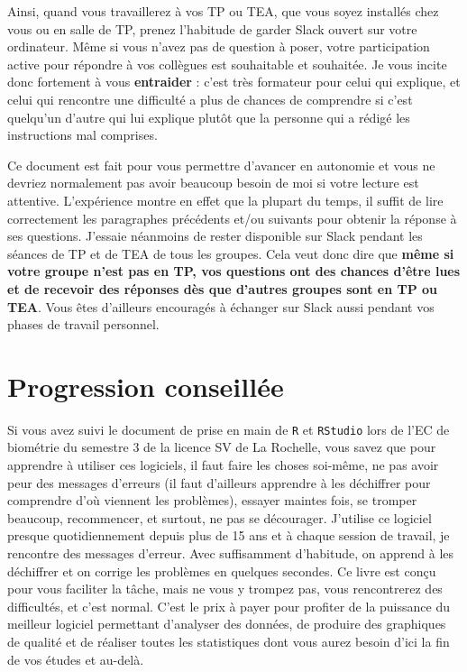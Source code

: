 \documentclass[
  french,
  a4paper,
  DIV=11,
  numbers=noendperiod,
  oneside]{scrreprt}
\begin{document}
Ainsi, quand vous travaillerez à vos TP ou TEA, que vous soyez installés
chez vous ou en salle de TP, prenez l'habitude de garder Slack ouvert
sur votre ordinateur. Même si vous n'avez pas de question à poser, votre
participation active pour répondre à vos collègues est souhaitable et
souhaitée. Je vous incite donc fortement à vous \textbf{entraider} :
c'est très formateur pour celui qui explique, et celui qui rencontre une
difficulté a plus de chances de comprendre si c'est quelqu'un d'autre
qui lui explique plutôt que la personne qui a rédigé les instructions
mal comprises.

Ce document est fait pour vous permettre d'avancer en autonomie et vous
ne devriez normalement pas avoir beaucoup besoin de moi si votre lecture
est attentive. L'expérience montre en effet que la plupart du temps, il
suffit de lire correctement les paragraphes précédents et/ou suivants
pour obtenir la réponse à ses questions. J'essaie néanmoins de rester
disponible sur Slack pendant les séances de TP et de TEA de tous les
groupes. Cela veut donc dire que \textbf{même si votre groupe n'est pas
en TP, vos questions ont des chances d'être lues et de recevoir des
réponses dès que d'autres groupes sont en TP ou TEA}. Vous êtes
d'ailleurs encouragés à échanger sur Slack aussi pendant vos phases de
travail personnel.

\section*{Progression conseillée}\label{progression-conseilluxe9e}


Si vous avez suivi le document de prise en main de \texttt{R} et
\texttt{RStudio} lors de l'EC de biométrie du semestre 3 de la licence
SV de La Rochelle, vous savez que pour apprendre à utiliser ces
logiciels, il faut faire les choses soi-même, ne pas avoir peur des
messages d'erreurs (il faut d'ailleurs apprendre à les déchiffrer pour
comprendre d'où viennent les problèmes), essayer maintes fois, se
tromper beaucoup, recommencer, et surtout, ne pas se décourager.
J'utilise ce logiciel presque quotidiennement depuis plus de 15 ans et à
chaque session de travail, je rencontre des messages d'erreur. Avec
suffisamment d'habitude, on apprend à les déchiffrer et on corrige les
problèmes en quelques secondes. Ce livre est conçu pour vous faciliter
la tâche, mais ne vous y trompez pas, vous rencontrerez des difficultés,
et c'est normal. C'est le prix à payer pour profiter de la puissance du
meilleur logiciel permettant d'analyser des données, de produire des
graphiques de qualité et de réaliser toutes les statistiques dont vous
aurez besoin d'ici la fin de vos études et au-delà.
\end{document}

